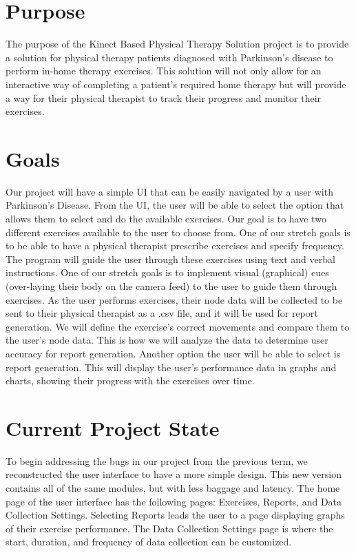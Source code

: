 \documentclass[onecolumn, draftclsnofoot,10pt, compsoc]{IEEEtran}
\begin{document}
\section{Purpose}
The purpose of the Kinect Based Physical Therapy Solution project is to provide a solution for physical therapy patients diagnosed with Parkinson's disease to perform in-home therapy exercises. This solution will not only allow for an interactive way of completing a patient's required home therapy but will provide a way for their physical therapist to track their progress and monitor their exercises.

\section{Goals}
Our project will have a simple UI that can be easily navigated by a user with Parkinson's Disease. From the UI, the user will be able to select the option that allows them to select and do the available exercises. Our goal is to have two different exercises available to the user to choose from. One of our stretch goals is to be able to have a physical therapist prescribe exercises and specify frequency. The program will guide the user through these exercises using text and verbal instructions. One of our stretch goals is to implement visual (graphical) cues (over-laying their body on the camera feed) to the user to guide them through exercises. As the user performs exercises, their node data will be collected to be sent to their physical therapist as a .csv file, and it will be used for report generation. We will define the exercise's correct movements and compare them to the user's node data. This is how we will analyze the data to determine user accuracy for report generation. Another option the user will be able to select is report generation. This will display the user's performance data in graphs and charts, showing their progress with the exercises over time. 

\section{Current Project State}
To begin addressing the bugs in our project from the previous term, we reconstructed the user interface to have a more simple design. This new version contains all of the same modules, but with less baggage and latency. The home page of the user interface has the following pages: Exercises, Reports, and Data Collection Settings. Selecting Reports leads the user to a page displaying graphs of their exercise performance. The Data Collection Settings page is where the start, duration, and frequency of data collection can be customized.
\end{document}
